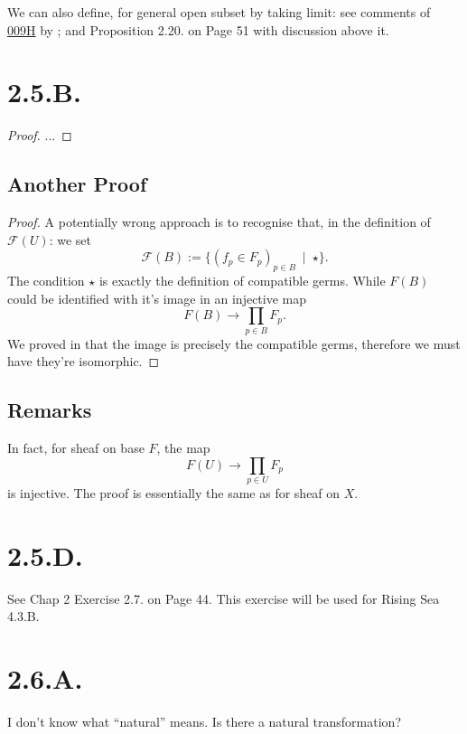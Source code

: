 We can also define, for general open subset by taking limit: see comments of \href{https://stacks.math.columbia.edu/tag/009H}{009H} by \cite{stacks-project}; and \cite{gortz2020algebraic} Proposition 2.20. on Page 51 with discussion above it.

\section{2.5.B.}

\begin{proof}
	...	
\end{proof}

\subsection{Another Proof}

\begin{proof}
A potentially wrong approach is to recognise that, in the definition of $\mathscr F(U)$: we set 
\[\mathscr F(B):=\{(f_p\in F_p)_{p\in B} ~\mid~ \star\}.\]
The condition $\star$ is exactly the definition of compatible germs. While $F(B)$ could be identified with it's image in an injective map
\[F(B)\to \prod_{p\in B}F_p.\]
We proved in  that the image is precisely the compatible germs, therefore we must have they're isomorphic.
\end{proof}

\subsection{Remarks}

In fact, for sheaf on base $F$, the map
\[F(U)\to\prod_{p\in U}F_p\] is injective. The proof is essentially the same as for sheaf on $X$.

\section{2.5.D.}

See \cite{qing2006algebraic} Chap 2 Exercise 2.7. on Page 44. This exercise will be used for Rising Sea \cite{RaviRisingSea} 4.3.B.

\section{2.6.A.}\label{2.6.A.}

I don't know what \enquote{natural} means. Is there a natural transformation? 

